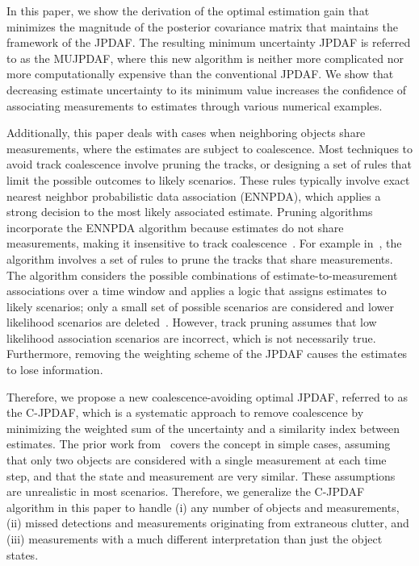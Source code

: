 \documentclass[letterpaper, paper,10pt]{AAS}		%
\begin{document}
In this paper, we show the derivation of the optimal estimation gain that minimizes the magnitude of the posterior covariance matrix that maintains the framework of the JPDAF.
The resulting minimum uncertainty JPDAF is referred to as the MUJPDAF, where this new algorithm is neither more complicated nor more computationally expensive than the conventional JPDAF.
We show that decreasing estimate uncertainty to its minimum value increases the confidence of associating measurements to estimates through various numerical examples.

Additionally, this paper deals with cases when neighboring objects share measurements, where the estimates are subject to coalescence.
Most techniques to avoid track coalescence involve pruning the tracks, or designing a set of rules that limit the possible outcomes to likely scenarios. These rules typically involve exact nearest neighbor probabilistic data association (ENNPDA), which applies a strong decision to the most likely associated estimate. Pruning algorithms incorporate the ENNPDA algorithm because  estimates do not share measurements, making it insensitive to track coalescence~\cite{Coal1}.
For example in~\cite{Fitzgerald}, the algorithm involves a set of rules to prune the tracks that share measurements.
The algorithm considers the possible combinations of estimate-to-measurement associations over a time window and applies a logic that assigns estimates to likely scenarios; only a small set of possible scenarios are considered and lower likelihood scenarios are deleted~\cite{Coal_d,Coal_e,Coal_c}.
However, track pruning assumes that low likelihood association scenarios are incorrect, which is not necessarily true.
Furthermore, removing the weighting scheme of the JPDAF causes the estimates to lose information.

Therefore, we propose a new coalescence-avoiding optimal JPDAF, referred to as the C-JPDAF, which is a systematic approach to remove coalescence by minimizing the weighted sum of the uncertainty and a similarity index between estimates.
The prior work from~\cite{KauLovLee14} covers the concept in simple cases, assuming that only two objects are considered with a single measurement at each time step, and that the state and measurement are very similar.
These assumptions are unrealistic in most scenarios.
Therefore, we generalize the C-JPDAF algorithm in this paper to handle (i) any number of objects and measurements, (ii) missed detections and measurements originating from extraneous clutter, and (iii) measurements with a much different interpretation than just the object states.
\end{document}
